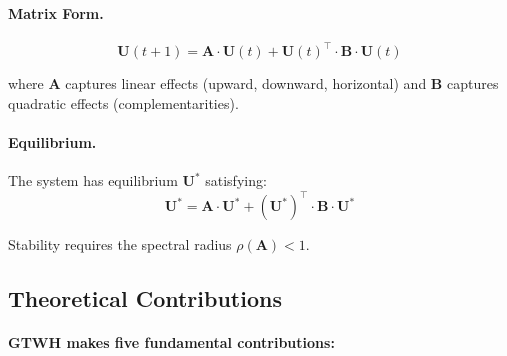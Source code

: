 \paragraph{Matrix Form.}
\begin{equation}
\mathbf{U}(t+1) = \mathbf{A} \cdot \mathbf{U}(t) + \mathbf{U}(t)^\top \cdot \mathbf{B} \cdot \mathbf{U}(t)
\end{equation}

where $\mathbf{A}$ captures linear effects (upward, downward, horizontal) and 
$\mathbf{B}$ captures quadratic effects (complementarities).

\paragraph{Equilibrium.}
The system has equilibrium $\mathbf{U}^*$ satisfying:
\begin{equation}
\mathbf{U}^* = \mathbf{A} \cdot \mathbf{U}^* + (\mathbf{U}^*)^\top \cdot \mathbf{B} \cdot \mathbf{U}^*
\end{equation}

Stability requires the spectral radius $\rho(\mathbf{A}) < 1$.

\subsection{Theoretical Contributions}

\paragraph{GTWH makes five fundamental contributions:}

